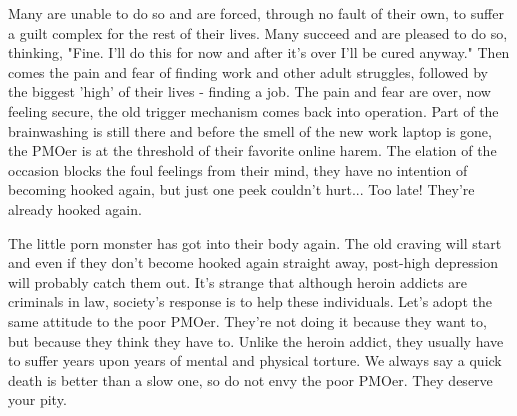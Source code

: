 Many are unable to do so and are forced, through no fault of their own, to suffer a guilt complex for the rest of their lives. Many succeed and are pleased to do so, thinking, "Fine. I'll do this for now and after it's over I'll be cured anyway." Then comes the pain and fear of finding work and other adult struggles, followed by the biggest 'high' of their lives - finding a job. The pain and fear are over, now feeling secure, the old trigger mechanism comes back into operation. Part of the brainwashing is still there and before the smell of the new work laptop is gone, the PMOer is at the threshold of their favorite online harem. The elation of the occasion blocks the foul feelings from their mind, they have no intention of becoming hooked again, but just one peek couldn't hurt... Too late! They're already hooked again.

The little porn monster has got into their body again. The old craving will start and even if they don't become hooked again straight away, post-high depression will probably catch them out. It's strange that although heroin addicts are criminals in law, society's response is to help these individuals. Let's adopt the same attitude to the poor PMOer. They're not doing it because they want to, but because they think they have to. Unlike the heroin addict, they usually have to suffer years upon years of mental and physical torture. We always say a quick death is better than a slow one, so do not envy the poor PMOer. They deserve your pity.
